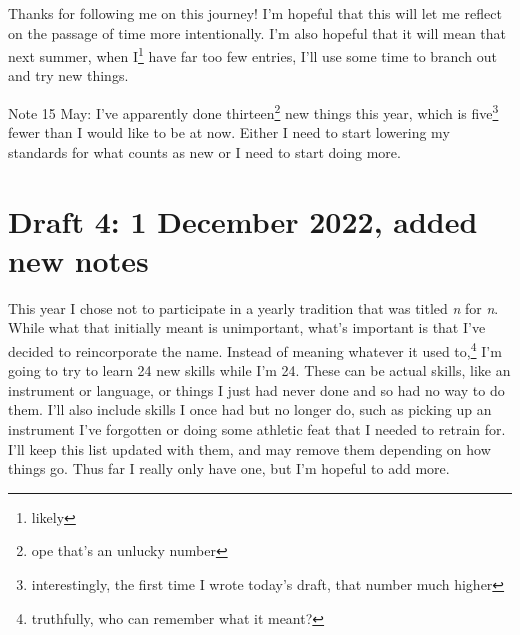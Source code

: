 \documentclass[12pt]{article}[titlepage]
\newcommand{\1}{\={a}}
\newcommand{\2}{\={e}}
\newcommand{\3}{\={\i}}
\newcommand{\4}{\=o}
\newcommand{\5}{\=u}
\newcommand{\6}{\={A}}
\renewcommand{\,}{\textsuperscript{,}}
\begin{document}
Thanks for following me on this journey!
I'm hopeful that this will let me reflect on the passage of time more intentionally.
I'm also hopeful that it will mean that next summer, when I\footnote{likely} have far too few entries, I'll use some time to branch out and try new things.

Note 15 May: 
I've apparently done thirteen\footnote{ope that's an unlucky number} new things this year, which is five\footnote{interestingly, the first time I wrote today's draft, that number much higher} fewer than I would like to be at now.
Either I need to start lowering my standards for what counts as new or I need to start doing more.

\section{Draft 4: 1 December 2022, added new notes}
This year I chose not to participate in a yearly tradition that was titled \textit{n} for \textit{n}.
While what that initially meant is unimportant, what's important is that I've decided to reincorporate the name.
Instead of meaning whatever it used to,\footnote{truthfully, who can remember what it meant?} I'm going to try to learn 24 new skills while I'm 24.
These can be actual skills, like an instrument or language, or things I just had never done and so had no way to do them.
I'll also include skills I once had but no longer do, such as picking up an instrument I've forgotten or doing some athletic feat that I needed to retrain for.
I'll keep this list updated with them, and may remove them depending on how things go.
Thus far I really only have one, but I'm hopeful to add more.
\end{document}
